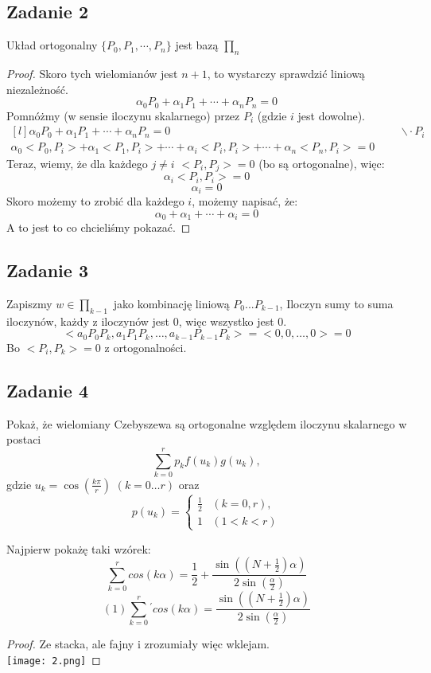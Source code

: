 \documentclass[a4paper]{article}
\begin{document}
\subsection*{Zadanie 2}
Układ ortogonalny $\lbrace P_0,P_1,\cdots ,P_n \rbrace$ jest bazą $\prod_n $
\begin{proof}
Skoro tych wielomianów jest $n+1$, to wystarczy sprawdzić liniową niezależność.
$$\alpha_0 P_0+\alpha_1 P_1+\cdots+\alpha_n P_n=0 $$
Pomnóżmy (w sensie iloczynu skalarnego) przez $P_i$ (gdzie $i$ jest dowolne).
$$\begin{matrix*}[l]
\alpha_0 P_0+\alpha_1 P_1+\cdots+\alpha_n P_n=0 &&& \backslash \cdot P_i\\
\alpha_0 <P_0,P_i>+\alpha_1 <P_1,P_i>+\cdots + \alpha_i <P_i,P_i> +\cdots +\alpha_n <P_n,P_i>=0
\end{matrix*} $$
Teraz, wiemy, że dla każdego $j\neq i$ $<P_i,P_j>=0$ (bo są ortogonalne), więc:
$$\alpha_i <P_i,P_i> = 0$$
$$\alpha_i = 0$$
Skoro możemy to zrobić dla każdego $i$, możemy napisać, że:
$$\alpha_0+\alpha_1+\cdots +\alpha_i = 0$$
A to jest to co chcieliśmy pokazać.
\end{proof}

\subsection*{Zadanie 3}
Zapiszmy $w \in \prod_{k-1}$ jako kombinację liniową $P_0...P_{k-1}$, Iloczyn sumy to suma iloczynów, każdy z iloczynów jest 0, więc wszystko jest 0.
$$<a_0P_0P_k,a_1P_1P_k,\dots ,a_{k-1}P_{k-1}P_{k}> = <0,0,\dots ,0>=0$$
Bo $<P_i,P_k>=0$ z ortogonalności.

\subsection*{Zadanie 4}
Pokaż, że wielomiany Czebyszewa są ortogonalne względem iloczynu skalarnego w postaci $$\sum\limits_{k=0}^{r} p_kf(u_k)g(u_k),$$ gdzie $u_k=\cos(\frac{k\pi}{r})$ $(k=0\dots r)$ oraz $$p(u_k) = \left\{\begin{matrix}
\frac{1}{2} & (k=0,r), \\ 
1 & (1<k<r) 
\end{matrix}\right.$$

Najpierw pokażę taki wzórek:
$$\sum\limits_{k=0}^{r} cos(k\alpha) = \frac{1}{2}+\frac{\sin((N+\frac{1}{2})\alpha)}{2\sin(\frac{\alpha}{2})} $$
$$(1) \sum\limits_{k=0}^{r}{}^{'} cos(k\alpha) = \frac{\sin((N+\frac{1}{2})\alpha)}{2\sin(\frac{\alpha}{2})} $$
\begin{proof}
Ze stacka, ale fajny i zrozumiały więc wklejam.\\
\texttt{[image: 2.png]}


\end{proof}
\end{document}
